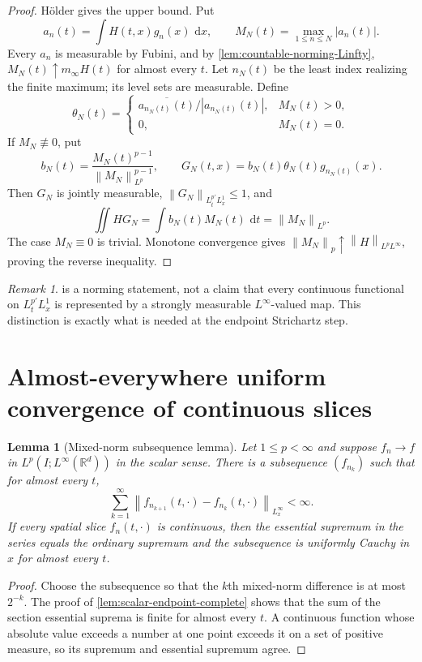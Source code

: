 \documentclass[11pt,oneside]{book}
\newtheorem{lemma}[theorem]{Lemma}
\theoremstyle{definition}
\theoremstyle{remark}
\newtheorem{remark}[theorem]{Remark}
\newcommand{\R}{\mathbb R}
\newcommand{\1}{\mathbf 1}
\newcommand{\dd}{\,\mathrm d}
\newcommand{\norm}[1]{\left\lVert #1\right\rVert}
\begin{document}
\begin{proof}
H\"older gives the upper bound.  Put
\[
 a_n(t)=\int H(t,x)g_n(x)\,\dd x,
 \qquad M_N(t)=\max_{1\le n\le N}|a_n(t)|.
\]
Every $a_n$ is measurable by Fubini, and by
\cref{lem:countable-norming-Linfty},
$M_N(t)\uparrow m_\infty H(t)$ for almost every $t$.
Let $n_N(t)$ be the least index realizing the finite maximum; its level sets
are measurable.  Define
\[
 \theta_N(t)=
 \begin{cases}
  \overline{a_{n_N(t)}(t)}/|a_{n_N(t)}(t)|,&M_N(t)>0,\\
  0,&M_N(t)=0.
 \end{cases}
\]
If $M_N\not\equiv0$, put
\[
 b_N(t)=\frac{M_N(t)^{p-1}}{\norm{M_N}_{L^p}^{p-1}},
 \qquad
 G_N(t,x)=b_N(t)\theta_N(t)g_{n_N(t)}(x).
\]
Then $G_N$ is jointly measurable,
$\norm{G_N}_{L^{p'}_tL^1_x}\le1$, and
\[
 \iint HG_N=\int b_N(t)M_N(t)\,\dd t=\norm{M_N}_{L^p}.
\]
The case $M_N\equiv0$ is trivial.  Monotone convergence gives
$\norm{M_N}_p\uparrow\norm H_{L^pL^\infty}$, proving the reverse inequality.
\end{proof}

\begin{remark}
 is a norming statement, not a claim that every
continuous functional on $L^{p'}_tL^1_x$ is represented by a strongly
measurable $L^\infty$-valued map.  This distinction is exactly what is needed
at the endpoint Strichartz step.
\end{remark}

\section{Almost-everywhere uniform convergence of continuous slices}

\begin{lemma}[Mixed-norm subsequence lemma]
\label{lem:mixed-subsequence-uniform}
Let $1\le p<\infty$ and suppose $f_n\to f$ in
$L^p(I;L^\infty(\R^d))$ in the scalar sense.  There is a subsequence
$(f_{n_k})$ such that for almost every $t$,
\[
 \sum_{k=1}^\infty
 \norm{f_{n_{k+1}}(t,\cdot)-f_{n_k}(t,\cdot)}_{L^\infty_x}<\infty.
\]
If every spatial slice $f_n(t,\cdot)$ is continuous, then the essential
supremum in the series equals the ordinary supremum and the subsequence is
uniformly Cauchy in $x$ for almost every $t$.
\end{lemma}

\begin{proof}
Choose the subsequence so that the $k$th mixed-norm difference is at most
$2^{-k}$.  The proof of \cref{lem:scalar-endpoint-complete} shows that the
sum of the section essential suprema is finite for almost every $t$.  A
continuous function whose absolute value exceeds a number at one point
exceeds it on a set of positive measure, so its supremum and essential
supremum agree.
\end{proof}
\end{document}
